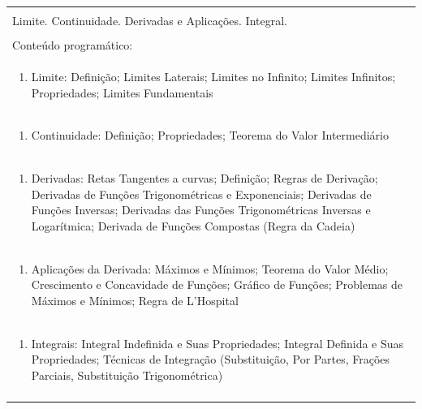 \documentclass[11pt]{article}
\begin{document}
\begin{center}
\begin{longtable}{|p{4cm}|p{4cm}|p{4cm}|p{4cm}|}
\multicolumn{4}{|p{16cm}|}{}\\
\multicolumn{4}{|p{\dimexpr 16cm + 6\tabcolsep\relax}|}{Limite. Continuidade. Derivadas e Aplicações. Integral.}\\
\multicolumn{4}{|p{16cm}|}{}\\
\hline
\multicolumn{4}{|p{16cm}|}{Conteúdo programático:}\\*
\multicolumn{4}{|p{\dimexpr 16cm + 6\tabcolsep\relax}|}{\begin{enumerate}[start=1]\item Limite: Definição; Limites Laterais; Limites no Infinito; Limites Infinitos; Propriedades; Limites Fundamentais\end{enumerate}}\\
\multicolumn{4}{|p{\dimexpr 16cm + 6\tabcolsep\relax}|}{\begin{enumerate}[start=2]\item Continuidade: Definição; Propriedades; Teorema do Valor Intermediário\end{enumerate}}\\
\multicolumn{4}{|p{\dimexpr 16cm + 6\tabcolsep\relax}|}{\begin{enumerate}[start=3]\item Derivadas: Retas Tangentes a curvas; Definição; Regras de Derivação; Derivadas de Funções Trigonométricas e Exponenciais; Derivadas de Funções Inversas; Derivadas das Funções Trigonométricas Inversas e Logarítmica; Derivada de Funções Compostas (Regra da Cadeia)\end{enumerate}}\\
\multicolumn{4}{|p{\dimexpr 16cm + 6\tabcolsep\relax}|}{\begin{enumerate}[start=4]\item Aplicações da Derivada: Máximos e Mínimos; Teorema do Valor Médio; Crescimento e Concavidade de Funções; Gráfico de Funções; Problemas de Máximos e Mínimos; Regra de L'Hospital\end{enumerate}}\\
\multicolumn{4}{|p{\dimexpr 16cm + 6\tabcolsep\relax}|}{\begin{enumerate}[start=5]\item Integrais: Integral Indefinida e Suas Propriedades; Integral Definida e Suas Propriedades; Técnicas de Integração (Substituição, Por Partes, Frações Parciais, Substituição Trigonométrica)\end{enumerate}}\\
\multicolumn{4}{|p{\dimexpr 16cm + 6\tabcolsep\relax}|}{}\\

\end{longtable}
\end{center}
\end{document}
